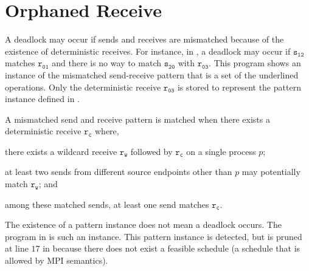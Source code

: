 \section{Orphaned Receive}


A deadlock may occur if sends and receives are mismatched because of the existence of deterministic receives. For instance, in , a deadlock may occur if $\mathtt{s_{12}}$ matches $\mathtt{r_{01}}$ and there is no way to match $\mathtt{s_{20}}$ with $\mathtt{r_{03}}$. This program shows an instance of the mismatched send-receive pattern that is a set of the underlined operations. Only the deterministic receive $\mathtt{r_{03}}$ is stored to represent the pattern instance defined in .


\begin{definition}
A mismatched send and receive pattern is matched when there exists a deterministic receive $\mathtt{r_c}$ where, 
\begin{compactenum}
\item there exists a wildcard receive $\mathtt{r_w}$ followed by $\mathtt{r_c}$ on a single process $\mathit{p}$; 
\item at least two sends from different source endpoints other than $\mathit{p}$ may potentially match $\mathtt{r_w}$; and
\item among these matched sends, at least one send matches $\mathtt{r_c}$. 
\end{compactenum}
\label{def:mismatch}
\end{definition}

\examplefigtwo

The existence of a pattern instance does not mean a deadlock occurs. The program in  is such an instance. This pattern instance is detected, but is pruned at line $17$ in  because there does not exist a feasible schedule (a schedule that is allowed by MPI semantics).




